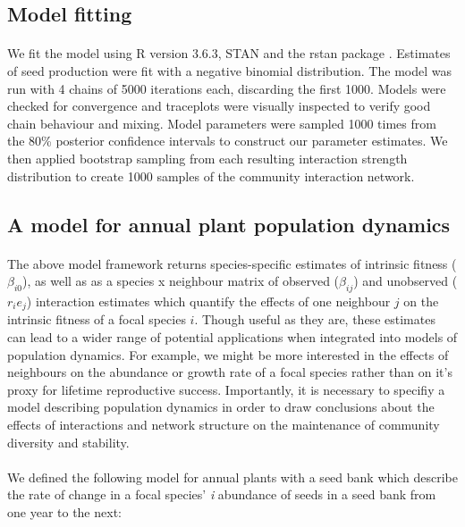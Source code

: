 \documentclass[a4,12pt]{article}
\begin{document}
        \subsection{Model fitting}

        \paragraph{}
        We fit the model using R version 3.6.3, STAN and the rstan package \parencite{R2020, Carpenter2017, Rstan2020}. Estimates of seed production were fit with a negative binomial distribution. The model was run with 4 chains of 5000 iterations each, discarding the first 1000. Models were checked for convergence and traceplots were visually inspected to verify good chain behaviour and mixing. Model parameters were sampled 1000 times from the 80\% posterior confidence intervals to construct our parameter estimates. We then applied bootstrap sampling from each resulting interaction strength distribution to create 1000 samples of the community interaction network.

        \subsection{A model for annual plant population dynamics}

        \paragraph{}
        The above model framework returns species-specific estimates of intrinsic fitness ($\beta_{i0}$), as well as as a species x neighbour matrix of observed ($\beta_{ij}$) and unobserved ($r_i e_j$) interaction estimates which quantify the effects of one neighbour $j$ on the intrinsic fitness of a focal species $i$. Though useful as they are, these estimates can lead to a wider range of potential applications when integrated into models of population dynamics. For example, we might be more interested in the effects of neighbours on the abundance or growth rate of a focal species rather than on it's proxy for lifetime reproductive success. Importantly, it is necessary to specifiy a model describing population dynamics in order to draw conclusions about the effects of interactions and network structure on the maintenance of community diversity and stability. 

        \paragraph{} 
        We defined the following model for annual plants with a seed bank \parencite{Levine2009, Mayfield2017, Bimler2018} which describe the rate of change in a focal species' \textit{i} abundance of seeds in a seed bank from one year to the next: 
    
\end{document}
